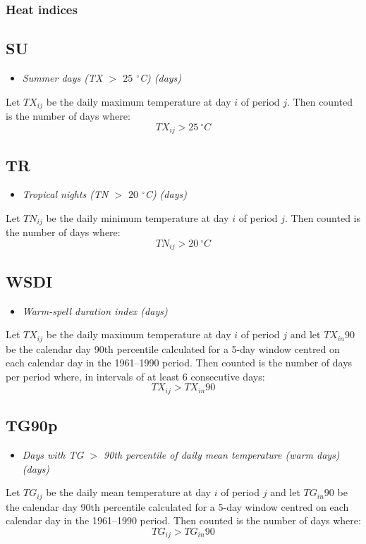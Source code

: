 \documentclass[a4paper,11pt]{article}
\begin{document}
\subsubsection{Heat indices}

\subsection*{SU}
\begin{itemize}
\item \textit{Summer days (TX $>$ $25$ $^\circ$C) (days)}
\end{itemize}
Let $TX_{ij}$ be the daily maximum temperature at day $i$ of period
$j$. Then counted is the number of days where:
\begin{equation*}
TX_{ij} > 25\:^\circ C
\end{equation*}

\subsection*{TR}
\begin{itemize}
\item \textit{Tropical nights (TN $>$ $20$ $^\circ$C) (days)}
\end{itemize}
Let $TN_{ij}$ be the daily minimum temperature at day $i$ of period
$j$. Then counted is the number of days where:
\begin{equation*}
TN_{ij} > 20 \:^\circ C
\end{equation*}

\subsection*{WSDI}
\begin{itemize}
\item \textit{Warm-spell duration index (days)}
\end{itemize}
Let $TX_{ij}$ be the daily maximum temperature at day $i$ of period
$j$ and let $TX_{in}90$ be the calendar day 90th percentile calculated
for a 5-day window centred on each calendar day in the 1961--1990
period. Then counted is the number of days per period where, in
intervals of at least 6 consecutive days:
\begin{equation*}
TX_{ij} > TX_{in}90
\end{equation*}

\subsection*{TG90p}
\begin{itemize}
\item \textit{Days with TG $>$ 90th percentile of daily mean temperature
(warm days) (days)}
\end{itemize}
Let $TG_{ij}$ be the daily mean temperature at day $i$ of period $j$
and let $TG_{in}90$ be the calendar day 90th percentile calculated for
a 5-day window centred on each calendar day in the 1961--1990
period. Then counted is the number of days where:
\begin{equation*}
TG_{ij} > TG_{in}90
\end{equation*}
\end{document}
